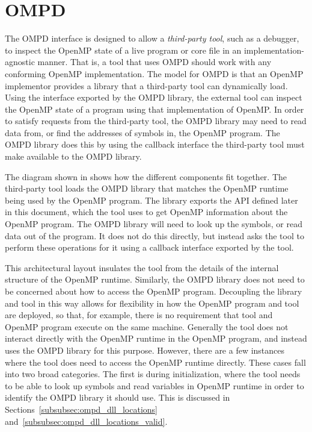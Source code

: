 \section{OMPD}
\label{sec:ompd-overview}
\label{sec:third-party-tool-callback-interface}

The OMPD interface is designed to allow a \emph{third-party tool},
such as a debugger, to inspect the OpenMP state of a live program
or core file in an implementation-agnostic manner.
That is, a tool that uses OMPD should work with any conforming
OpenMP implementation.
The model for OMPD is that an OpenMP implementor provides a
library that a third-party tool can dynamically load.
Using the interface exported by the OMPD library, the external tool can
inspect the OpenMP state of a program using that implementation of OpenMP.
In order to satisfy requests from the third-party tool, the OMPD library
may need to read data from, or find the addresses of symbols in,
the OpenMP program.
The OMPD library does this by using the callback interface the third-party
tool must make available to the OMPD library.

%


The diagram shown in   shows how the different
components fit together.
The third-party tool loads the OMPD library that matches the OpenMP runtime
being used by the OpenMP program.
The library exports the API defined later in this document,
which the tool uses to get OpenMP information about the OpenMP program.
The OMPD library will need to look up the symbols,
or read data out of the program.
It does not do this directly, but instead asks the tool to perform
these operations for it using a callback interface exported by the tool.

This architectural layout insulates the tool from the details
of the internal structure of the OpenMP runtime.
Similarly, the OMPD library does not need to be concerned about
how to access the OpenMP program.
Decoupling the library and tool in this way allows for
flexibility in how the OpenMP program and tool are deployed,
so that, for example, there is no requirement that tool
and OpenMP program execute on the same machine.
Generally the tool does not interact directly with the OpenMP
runtime in the OpenMP program, and instead uses the OMPD library
for this purpose.
However, there are a few instances where the tool does need
to access the OpenMP runtime directly.
These cases fall into two broad categories.
The first is during initialization, where the tool needs
to be able to look up symbols and read variables in OpenMP runtime
in order to identify the OMPD library it should use.
This is discussed in Sections~\ref{subsubsec:ompd_dll_locations}
and~\ref{subsubsec:ompd_dll_locations_valid}.

